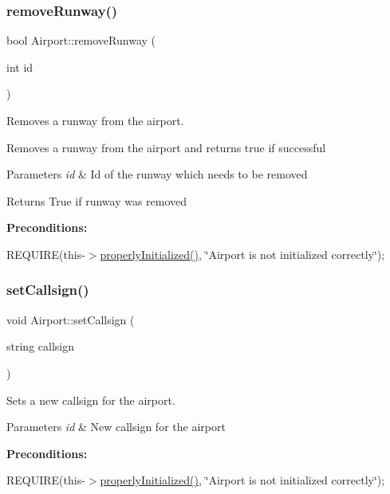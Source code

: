 \subsubsection{\texorpdfstring{remove\+Runway()}{removeRunway()}}
{\footnotesize\ttfamily bool Airport\+::remove\+Runway (\begin{DoxyParamCaption}\item[{int}]{id }\end{DoxyParamCaption})}



Removes a runway from the airport. 

Removes a runway from the airport and returns true if successful


\begin{DoxyParams}{Parameters}
{\em id} & Id of the runway which needs to be removed \\
\hline
\end{DoxyParams}
\begin{DoxyReturn}{Returns}
True if runway was removed
\end{DoxyReturn}
{\bfseries Preconditions\+:}
\begin{DoxyItemize}
\item R\+E\+Q\+U\+I\+RE(this-\/$>$\mbox{\hyperlink{class_airport_aa13e68ac58e8875837fbe888325cfff6}{properly\+Initialized()}}, \char`\"{}\+Airport is not initialized correctly\char`\"{}); 
\end{DoxyItemize}\mbox{\label{class_airport_a211a2877b1d654a9a50b28f260eec159}} 
\subsubsection{\texorpdfstring{set\+Callsign()}{setCallsign()}}
{\footnotesize\ttfamily void Airport\+::set\+Callsign (\begin{DoxyParamCaption}\item[{string}]{callsign }\end{DoxyParamCaption})}



Sets a new callsign for the airport. 


\begin{DoxyParams}{Parameters}
{\em id} & New callsign for the airport\\
\hline
\end{DoxyParams}
{\bfseries Preconditions\+:}
\begin{DoxyItemize}
\item R\+E\+Q\+U\+I\+RE(this-\/$>$\mbox{\hyperlink{class_airport_aa13e68ac58e8875837fbe888325cfff6}{properly\+Initialized()}}, \char`\"{}\+Airport is not initialized correctly\char`\"{}); 
\end{DoxyItemize}\mbox{\label{class_airport_a9555c51c003f8acb412e07442cb920c8}} 
